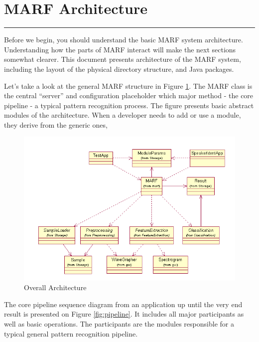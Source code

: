 \section{MARF Architecture}
\noindent
\rule{7.0in}{.013in}

Before we begin, you should understand the basic
MARF  system  architecture. Understanding how the
parts of MARF interact will make the next sections
somewhat clearer. This document presents architecture
of the MARF system, including the layout of the physical
directory structure, and Java packages.

Let's take a look at the general MARF structure in Figure \ref{fig:arch}.
The MARF class is the central ``server'' and configuration placeholder which major method -
the core pipeline - a typical pattern recognition process.
The figure presents basic abstract modules of the architecture.
When a developer needs to add or use a module, they derive
from the generic ones,

\begin{figure}
	\centering
	\includegraphics[angle=90]{../graphics/arch/arch-general.png}
	\caption{Overall Architecture}
	\label{fig:arch}
\end{figure}

The core pipeline sequence diagram from an application
up until the very end result is presented on Figure \ref{fig:pipeline}. It includes all major
participants as well as basic operations. The participants are the
modules responsible for a typical general pattern recognition pipeline.

